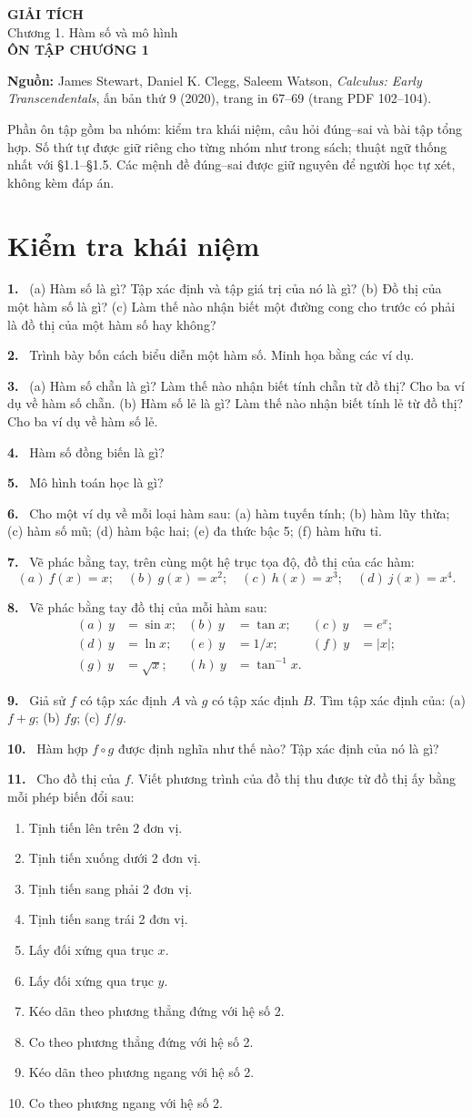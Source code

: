 \documentclass[12pt,a4paper]{article}
\newcommand{\bt}[1]{\par\smallskip\noindent\textbf{#1.}\ }
\begin{document}
\begin{center}
{\Large\bfseries GIẢI TÍCH}\\[5pt]
{\large Chương 1. Hàm số và mô hình}\\[9pt]
{\Large\bfseries ÔN TẬP CHƯƠNG 1}
\end{center}
\noindent\textbf{Nguồn:} James Stewart, Daniel K. Clegg, Saleem Watson, \textit{Calculus: Early Transcendentals}, ấn bản thứ 9 (2020), trang in 67–69 (trang PDF 102–104).

Phần ôn tập gồm ba nhóm: kiểm tra khái niệm, câu hỏi đúng–sai và bài tập tổng hợp. Số thứ tự được giữ riêng cho từng nhóm như trong sách; thuật ngữ thống nhất với §1.1–§1.5. Các mệnh đề đúng–sai được giữ nguyên để người học tự xét, không kèm đáp án.
\section*{Kiểm tra khái niệm}
\bt{1} (a) Hàm số là gì? Tập xác định và tập giá trị của nó là gì? (b) Đồ thị của một hàm số là gì? (c) Làm thế nào nhận biết một đường cong cho trước có phải là đồ thị của một hàm số hay không?
\bt{2} Trình bày bốn cách biểu diễn một hàm số. Minh họa bằng các ví dụ.
\bt{3} (a) Hàm số chẵn là gì? Làm thế nào nhận biết tính chẵn từ đồ thị? Cho ba ví dụ về hàm số chẵn. (b) Hàm số lẻ là gì? Làm thế nào nhận biết tính lẻ từ đồ thị? Cho ba ví dụ về hàm số lẻ.
\bt{4} Hàm số đồng biến là gì?
\bt{5} Mô hình toán học là gì?
\bt{6} Cho một ví dụ về mỗi loại hàm sau: (a) hàm tuyến tính; (b) hàm lũy thừa; (c) hàm số mũ; (d) hàm bậc hai; (e) đa thức bậc 5; (f) hàm hữu tỉ.
\bt{7} Vẽ phác bằng tay, trên cùng một hệ trục tọa độ, đồ thị của các hàm:
\[(a)\ f(x)=x;\quad(b)\ g(x)=x^2;\quad(c)\ h(x)=x^3;\quad(d)\ j(x)=x^4.\]
\bt{8} Vẽ phác bằng tay đồ thị của mỗi hàm sau:
\begin{align*}
(a)\ y&=\sin x;&(b)\ y&=\tan x;&(c)\ y&=e^x;\\
(d)\ y&=\ln x;&(e)\ y&=1/x;&(f)\ y&=|x|;\\
(g)\ y&=\sqrt{x};&(h)\ y&=\tan^{-1}x.
\end{align*}
\bt{9} Giả sử $f$ có tập xác định $A$ và $g$ có tập xác định $B$. Tìm tập xác định của: (a) $f+g$; (b) $fg$; (c) $f/g$.
\bt{10} Hàm hợp $f\circ g$ được định nghĩa như thế nào? Tập xác định của nó là gì?
\bt{11} Cho đồ thị của $f$. Viết phương trình của đồ thị thu được từ đồ thị ấy bằng mỗi phép biến đổi sau:
\begin{enumerate}[label=(\alph*)]
\item Tịnh tiến lên trên 2 đơn vị.
\item Tịnh tiến xuống dưới 2 đơn vị.
\item Tịnh tiến sang phải 2 đơn vị.
\item Tịnh tiến sang trái 2 đơn vị.
\item Lấy đối xứng qua trục $x$.
\item Lấy đối xứng qua trục $y$.
\item Kéo dãn theo phương thẳng đứng với hệ số 2.
\item Co theo phương thẳng đứng với hệ số 2.
\item Kéo dãn theo phương ngang với hệ số 2.
\item Co theo phương ngang với hệ số 2.
\end{enumerate}
\end{document}
